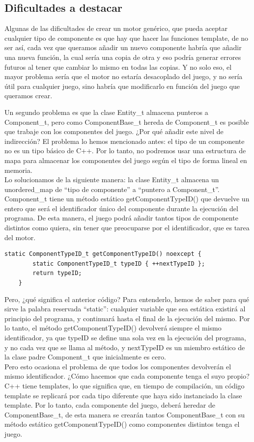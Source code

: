 \subsection{Dificultades a destacar}
Algunas de las dificultades de crear un motor genérico, que pueda aceptar cualquier tipo de componente es que hay que hacer las funciones template, de no ser así, cada vez que queramos añadir un nuevo componente habría que añadir una nueva función, la cual sería una copia de otra y eso podría generar errores futuros al tener que cambiar lo mismo en todas las copias. Y no solo eso, el mayor problema sería que el motor no estaría desacoplado del juego, y no sería útil para cualquier juego, sino habría que modificarlo en función del juego que queramos crear.

Un segundo problema es que la clase Entity\_t almacena punteros a Component\_t, pero como ComponentBase\_t hereda de Component\_t es posible que trabaje con los componentes del juego. ¿Por qué añadir este nivel de indirección? El problema lo hemos mencionado antes: el tipo de un componente no es un tipo básico de C++. Por lo tanto, no podremos usar una estructura de mapa para almacenar los componentes del juego según el tipo de forma lineal en memoria.
\\
Lo solucionamos de la siguiente manera: la clase Entity\_t almacena un unordered\_map de ``tipo de componente'' a ``puntero a Component\_t''. Component\_t tiene un método estático getComponentTypeID() que devuelve un entero que será el identificador único del componente durante la ejecución del programa. De esta manera, el juego podrá añadir tantos tipos de componente distintos como quiera, sin tener que preocuparse por el identificador, que es tarea del motor.
\begin{lstlisting}[style=C-color, caption={Cómo poder tener un número variable de componentes, sin tener que añadir un nuevo identificador con cada componente nuevo.},label=C_code-color]
	static ComponentTypeID_t getComponentTypeID() noexcept {
		static ComponentTypeID_t typeID { ++nextTypeID };
		return typeID;
	}
\end{lstlisting}
Pero, ¿qué significa el anterior código? Para entenderlo, hemos de saber para qué sirve la palabra reservada ``static'': cualquier variable que sea estática existirá al principio del programa, y continuará hasta el final de la ejecución del mismo. Por lo tanto, el método getComponentTypeID() devolverá siempre el mismo identificador, ya que typeID se define una sola vez en la ejecución del programa, y no cada vez que se llama al método, y nextTypeID es un miembro estático de la clase padre Component\_t que inicialmente es cero.
\\
Pero esto ocasiona el problema de que todos los componentes devolverán el mismo identificador. ¿Cómo hacemos que cada componente tenga el suyo propio? C++ tiene templates, lo que significa que, en tiempo de compilación, un código template se replicará por cada tipo diferente que haya sido instanciado la clase template. Por lo tanto, cada componente del juego, deberá heredar de ComponentBase\_t, de esta manera se crearán tantos ComponentBase\_t con su método estático getComponentTypeID() como componentes distintos tenga el juego.

